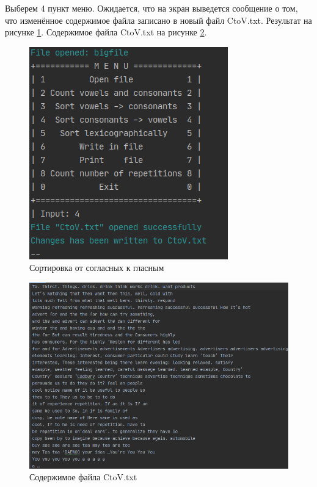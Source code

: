 \documentclass[12pt,a4paper]{article}  %
\begin{document}
Выберем 4 пункт меню. Ожидается, что на экран выведется сообщение о том, что изменённое содержимое файла записано в новый файл CtoV.txt. Результат на рисунке \ref{ctov}. Содержимое файла CtoV.txt на рисунке \ref{ctov_txt}.
\begin{figure}[htp!]
	\centering
	\includegraphics[width=0.5\linewidth]{photo/tests/ctov}
	\caption{Сортировка от согласных к гласным}
	\label{ctov}
\end{figure}

\begin{figure}[htp!]
	\centering
	\includegraphics[width=0.9\linewidth]{photo/tests/ctov_txt}
	\caption{Содержимое файла CtoV.txt}
	\label{ctov_txt}
\end{figure}
\end{document}
